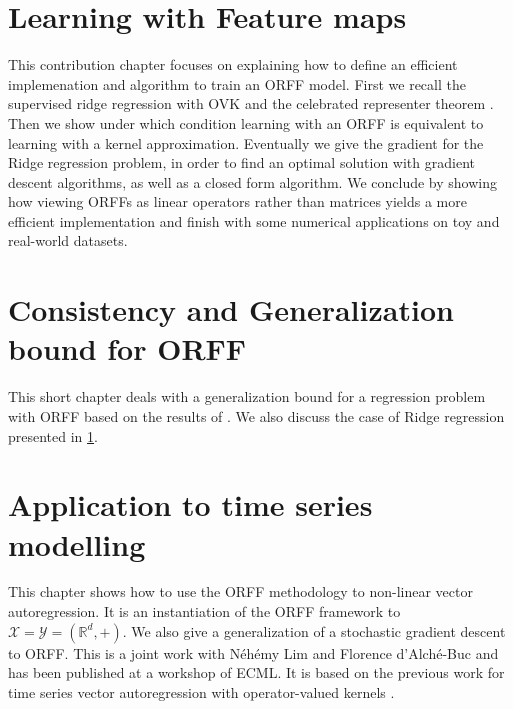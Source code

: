 \chapter{Learning with Feature maps}
\label{ch:learning operator-valued_random_fourier_features}
\bigskip
\begin{justify}
    This contribution chapter focuses on explaining how to define an efficient
    implemenation and algorithm to train an \acs{ORFF} model. First we recall
    the supervised ridge regression with \acs{OVK} and the celebrated
    representer theorem \citep{Wahba90}. Then we show under which condition
    learning with an \acs{ORFF} is equivalent to learning with a kernel
    approximation. Eventually we give the gradient for the Ridge regression
    problem, in order to find an optimal solution with gradient descent
    algorithms, as well as a closed form algorithm.  We conclude by showing how
    viewing \acsp{ORFF} as linear operators rather than matrices yields a more
    efficient implementation and finish with some numerical applications on toy
    and real-world datasets.
\end{justify}
\minitoc


\chapter{Consistency and Generalization bound for ORFF}
\label{ch:generalization_for_ORFF}
\bigskip
\begin{justify}
    This short chapter deals with a generalization bound for a regression
    problem with ORFF based on the results of \citet{rahimi2009weighted,
    maurer2016vector}. We also discuss the case of Ridge regression presented
    in \cref{ch:learning operator-valued_random_fourier_features}.
\end{justify}
\minitoc



\chapter{Application to time series modelling} %
\label{ch:applications}
\bigskip
\begin{justify}
    This chapter shows how to use the \acs{ORFF} methodology to non-linear
    vector autoregression. It is an instantiation of the \acs{ORFF} framework
    to $\mathcal{X}=\mathcal{Y}=(\mathbb{R}^d, +)$. We also give a
    generalization of a stochastic gradient descent \citep{dai2014scalable} to
    \acs{ORFF}. This is a joint work with N\'eh\'emy Lim and Florence
    d'Alch\'e-Buc and has been published at a workshop of \acs{ECML}. It is
    based on the previous work \citet{Lim2015} for time series vector
    autoregression with operator-valued kernels \cite{brault2016scaling}.
\end{justify}
\minitoc

